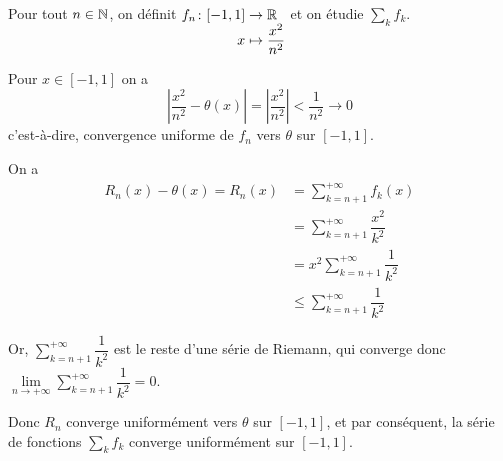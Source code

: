 \documentclass[a4paper, 12pt]{article}
\begin{document}
\begin{exemple}
    Pour tout $n \in \mathbb{N}$, on définit $\funcdef{f_n}{[-1, 1]}{\R}{x}{\dfrac{x^2}{n^2}}$ et on étudie $\sum\limits_k f_k$.

    Pour $x \in [-1, 1]$ on a 
    $$
    \left|\dfrac{x^2}{n^2} - \theta(x)\right| = \left|\dfrac{x^2}{n^2}\right| < \dfrac{1}{n^2} \to 0
    $$
    c'est-à-dire, convergence uniforme de $f_n$ vers $\theta$ sur $[-1, 1]$.

    On a
    \begin{align*}
        R_n(x) - \theta(x) = R_n(x) &= \sum_{k=n+1}^{+\infty} f_k(x) \\
        &= \sum_{k=n+1}^{+\infty} \dfrac{x^2}{k^2} \\
        &= x^2 \sum_{k=n+1}^{+\infty} \dfrac{1}{k^2} \\
        &\leq \sum_{k=n+1}^{+\infty} \dfrac{1}{k^2}
    \end{align*}

    Or, $\sum\limits_{k=n+1}^{+\infty} \dfrac{1}{k^2}$ est le reste d'une série de Riemann, qui converge donc $\lim\limits_{n \to +\infty} \sum\limits_{k=n+1}^{+\infty} \dfrac{1}{k^2} = 0$.

    Donc $R_n$ converge uniformément vers $\theta$ sur $[-1, 1]$, et par conséquent, la série de fonctions $\sum\limits_k f_k$ converge uniformément sur $[-1, 1]$.
\end{exemple}
\end{document}
